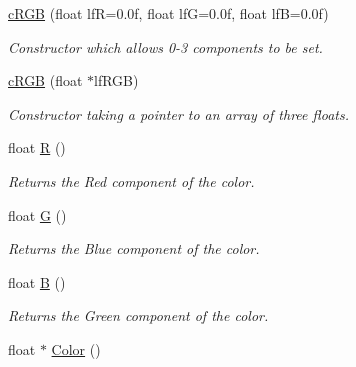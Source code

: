 \begin{DoxyCompactItemize}
\item 
\hypertarget{classc_r_g_b_a833a818aae27ee4dde171f2e317585d4}{
\hyperlink{classc_r_g_b_a833a818aae27ee4dde171f2e317585d4}{cRGB} (float lfR=0.0f, float lfG=0.0f, float lfB=0.0f)}
\label{classc_r_g_b_a833a818aae27ee4dde171f2e317585d4}

\begin{DoxyCompactList}\small\item\em Constructor which allows 0-\/3 components to be set. \end{DoxyCompactList}\item 
\hypertarget{classc_r_g_b_a9f0e889346aaec9a19b1a7fd2400a53e}{
\hyperlink{classc_r_g_b_a9f0e889346aaec9a19b1a7fd2400a53e}{cRGB} (float $\ast$lfRGB)}
\label{classc_r_g_b_a9f0e889346aaec9a19b1a7fd2400a53e}

\begin{DoxyCompactList}\small\item\em Constructor taking a pointer to an array of three floats. \end{DoxyCompactList}\item 
\hypertarget{classc_r_g_b_a701ca35633538dad46c30e2932543f1d}{
float \hyperlink{classc_r_g_b_a701ca35633538dad46c30e2932543f1d}{R} ()}
\label{classc_r_g_b_a701ca35633538dad46c30e2932543f1d}

\begin{DoxyCompactList}\small\item\em Returns the Red component of the color. \end{DoxyCompactList}\item 
\hypertarget{classc_r_g_b_a1e34ef9bd5e4379d6289600ce2c105ae}{
float \hyperlink{classc_r_g_b_a1e34ef9bd5e4379d6289600ce2c105ae}{G} ()}
\label{classc_r_g_b_a1e34ef9bd5e4379d6289600ce2c105ae}

\begin{DoxyCompactList}\small\item\em Returns the Blue component of the color. \end{DoxyCompactList}\item 
\hypertarget{classc_r_g_b_a41d85feae44ddfa8af7244d57a43b284}{
float \hyperlink{classc_r_g_b_a41d85feae44ddfa8af7244d57a43b284}{B} ()}
\label{classc_r_g_b_a41d85feae44ddfa8af7244d57a43b284}

\begin{DoxyCompactList}\small\item\em Returns the Green component of the color. \end{DoxyCompactList}\item 
\hypertarget{classc_r_g_b_a4e1d05eb87499169150216067361c53c}{
float $\ast$ \hyperlink{classc_r_g_b_a4e1d05eb87499169150216067361c53c}{Color} ()}
\label{classc_r_g_b_a4e1d05eb87499169150216067361c53c}


\end{DoxyCompactItemize}
